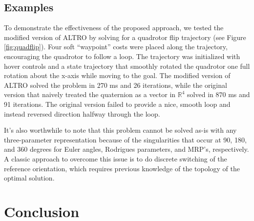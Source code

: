 \documentclass[letterpaper, 10 pt, conference]{ieeeconf}  %
\newcommand{\R}{\mathbb{R}}
\newcommand{\todo}[1]{\textcolor{red}{TODO: #1}}
\begin{document}
    \subsection{Examples}
        To demonstrate the effectiveness of the proposed approach, we tested the modified
        version of ALTRO by solving for a quadrotor flip trajectory (see Figure \ref{fig:quadflip}).
        Four soft ``waypoint'' costs were placed along the trajectory, encouraging the
        quadrotor to follow a loop. The trajectory was initialized with hover controls and a
        state trajectory that smoothly rotated the quadrotor one full rotation about the 
        x-axis while moving to the goal. 
        The modified version of ALTRO solved the problem in 270 ms and 26 iterations, while
        the original version that naively treated the quaternion as a vector in $\R^4$ 
        solved in 870 ms and 91 iterations. The original version failed to provide a nice,
        smooth loop and instead reversed direction halfway through the loop.

        It's also worthwhile to note that this problem cannot be solved as-is with any
        three-parameter representation because of the singularities that occur at 90, 180,
        and 360 degrees for Euler angles, Rodrigues parameters, and MRP's, respectively.
        A classic approach to overcome this issue is to do discrete switching of the 
        reference orientation, which requires previous knowledge of the topology of the
        optimal solution. 
        

\section{Conclusion} 
\end{document}

